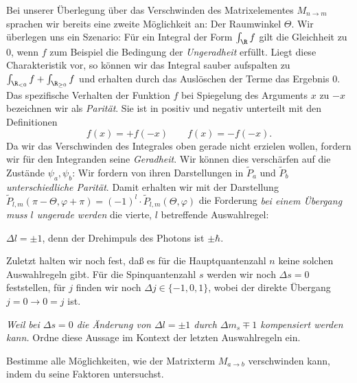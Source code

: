 \documentclass{subfile}
\begin{document}
        Bei unserer Überlegung über das Verschwinden des Matrixelementes $M_{n\to m}$ sprachen wir bereits eine zweite Möglichkeit an: Der Raumwinkel $\Theta$. Wir überlegen uns ein Szenario: Für ein Integral der Form $\int_\R f$ gilt die Gleichheit zu $0$, wenn $f$ zum Beispiel die Bedingung der \emph{Ungeradheit} erfüllt. Liegt diese Charakteristik vor, so können wir das Integral sauber aufspalten zu $\int_{\R_{<0}}f + \int_{\R_{\geq 0}}f$ und erhalten durch das Auslöschen der Terme das Ergebnis $0$. Das spezifische Verhalten der Funktion $f$ bei Spiegelung des Arguments $x$ zu $-x$ bezeichnen wir als \emph{Parität}. Sie ist in positiv und negativ unterteilt mit den Definitionen 
        \[
            f(x) = +f(-x)\qquad f(x) = -f(-x).
        \]
        Da wir das Verschwinden des Integrales oben gerade nicht erzielen wollen, fordern wir für den Integranden seine \emph{Geradheit}. Wir können dies verschärfen auf die Zustände $\psi_a,\psi_b$: Wir fordern von ihren Darstellungen in $\tilde P_a$ und $\tilde P_b$ \emph{unterschiedliche Parität}. Damit erhalten wir mit der Darstellung $\tilde P_{l,m}(\pi - \Theta,\varphi + \pi) = (-1)^l\cdot\tilde P_{l,m}(\Theta,\varphi)$ die Forderung \emph{bei einem Übergang muss $l$ ungerade werden} die vierte, $l$ betreffende Auswahlregel:
        \begin{center}
            $\Delta l = \pm 1$, denn der Drehimpuls des Photons ist $\pm\hbar$.
        \end{center}
        Zuletzt halten wir noch fest, daß es für die Hauptquantenzahl $n$ keine solchen Auswahlregeln gibt. Für die Spinquantenzahl $s$ werden wir noch $\Delta s = 0$ feststellen, für $j$ finden wir noch $\Delta j \in\{-1,0,1\}$, wobei der direkte Übergang $j = 0\to 0 = j$  ist.
        \begin{Aufgabe}
            \nr{} \emph{Weil bei $\Delta s = 0$ die Änderung von $\Delta l = \pm 1$ durch $\Delta m_s \mp 1$ kompensiert werden kann.} Ordne diese Aussage im Kontext der letzten Auswahlregeln ein. 

            \nr{} Bestimme alle Möglichkeiten, wie der Matrixterm $M_{a\to b}$ verschwinden kann, indem du seine Faktoren untersuchst. 
        \end{Aufgabe}
\end{document}
